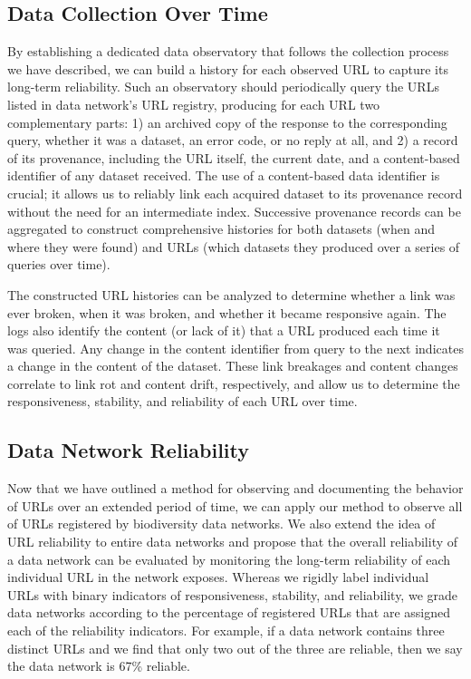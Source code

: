 \documentclass[10pt,letterpaper]{article}
\begin{document}
\subsection*{Data Collection Over Time}

By establishing a dedicated data observatory that follows the collection process we have described, we can build a history for each observed URL to capture its long-term reliability. Such an observatory should periodically query the URLs listed in data network’s URL registry, producing for each URL two complementary parts: 1) an archived copy of the response to the corresponding query, whether it was a dataset, an error code, or no reply at all, and 2) a record of its provenance, including the URL itself, the current date, and a content-based identifier of any dataset received. The use of a content-based data identifier is crucial; it allows us to reliably link each acquired dataset to its provenance record without the need for an intermediate index. Successive provenance records can be aggregated to construct comprehensive histories for both datasets (when and where they were found) and URLs (which datasets they produced over a series of queries over time).

The constructed URL histories can be analyzed to determine whether a link was ever broken, when it was broken, and whether it became responsive again. The logs also identify the content (or lack of it) that a URL produced each time it was queried. Any change in the content identifier from query to the next indicates a change in the content of the dataset. These link breakages and content changes correlate to link rot and content drift, respectively, and allow us to determine the responsiveness, stability, and reliability of each URL over time. 

\subsection*{Data Network Reliability}

Now that we have outlined a method for observing and documenting the behavior of URLs over an extended period of time, we can apply our method to observe all of URLs registered by biodiversity data networks. We also extend the idea of URL reliability to entire data networks and propose that the overall reliability of a data network can be evaluated by monitoring the long-term reliability of each individual URL in the network exposes. Whereas we rigidly label individual URLs with binary indicators of responsiveness, stability, and reliability, we grade data networks according to the percentage of registered URLs that are assigned each of the reliability indicators. For example, if a data network contains three distinct URLs and we find that only two out of the three are reliable, then we say the data network is 67\% reliable.
\end{document}
